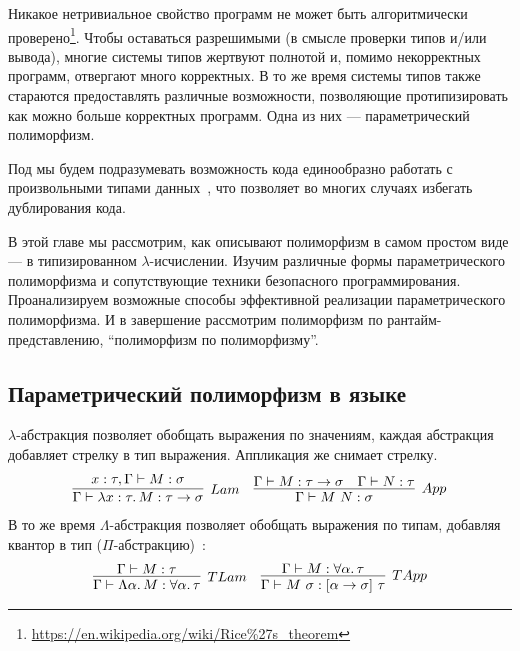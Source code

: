 
Никакое нетривиальное свойство программ не может быть алгоритмически проверено\footnote{\url{https://en.wikipedia.org/wiki/Rice\%27s_theorem}}.
Чтобы оставаться разрешимыми (в смысле проверки типов и/или вывода), многие системы типов жертвуют полнотой и, помимо некорректных программ, отвергают много корректных.
В то же время системы типов также стараются предоставлять различные возможности, позволяющие протипизировать как можно больше корректных программ.
Одна из них --- параметрический полиморфизм.

Под  мы будем подразумевать возможность кода единообразно работать с произвольными типами данных~\cite{strachey2000fundamental, cardelli1985understanding}, что позволяет во многих случаях избегать дублирования кода.

В этой главе мы рассмотрим, как описывают полиморфизм в самом простом виде --- в типизированном $\lambda$-исчислении.
Изучим различные формы параметрического полиморфизма и сопутствующие техники безопасного программирования.
Проанализируем возможные способы эффективной реализации параметрического полиморфизма.
И в завершение рассмотрим полиморфизм по рантайм-представлению, ``полиморфизм по полиморфизму''.

\subsection{Параметрический полиморфизм в языке} \label{subsec:lang-parametric-polumorphism}

$\lambda$-абстракция позволяет обобщать выражения по значениям, каждая абстракция добавляет стрелку в тип выражения.
Аппликация же снимает стрелку.
\[
    \begin{array}{cc}
        \infer[Lam]{\Gamma\vdash \lambda x : \tau\ldotp M : \tau\to\sigma}{x : \tau, \Gamma\vdash M : \sigma}
        &
        \infer[App]{\Gamma\vdash M\ap N : \sigma}{\Gamma\vdash M : \tau\to\sigma & \Gamma\vdash N : \tau}
    \end{array}
\]
В то же время $\Lambda$-абстракция позволяет обобщать выражения по типам, добавляя квантор в тип ($\Pi$-абстракцию)~\cite[глава 23]{pierce2002types}:
\[
    \begin{array}{cc}
        \infer[TLam]{\Gamma\vdash\Lambda\alpha\ldotp M : \forall\alpha\ldotp\tau}{\Gamma\vdash M : \tau}
        &
        \infer[TApp]{\Gamma\vdash M\ap\sigma : [\alpha\to\sigma]\ap\tau}{\Gamma\vdash M : \forall\alpha\ldotp\tau}
    \end{array}
\]

